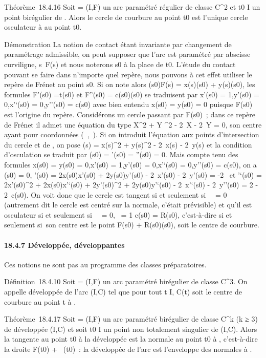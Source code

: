 Théorème~18.4.16 Soit \Gamma = (I,F) un arc paramétré régulier de classe
C^2 et t0 \in I un point birégulier de \Gamma. Alors le
cercle de courbure au point t0 est l'unique cercle osculateur
à \Gamma au point t0.

Démonstration La notion de contact étant invariante par changement de
paramétrage admissible, on peut supposer que l'arc est paramétré par
abscisse curviligne, s\mapsto~F(s) et nous noterons
s0 à la place de t0. L'étude du contact pouvant se
faire dans n'importe quel repère, nous pouvons à cet effet utiliser le
repère de Frénet au point s0. Si on note alors
\overrightarrowF(s0)F(s) =
x(s)\vect(s0) +
y(s)\vecn(s0), les formules
F'(s0) =\vec t(s0) et
F''(s0) =
c(s0)\vecn(s0) se traduisent par
x'(s0) = 1,y'(s0) = 0,x'`(s0) =
0,y''(s0) = c(s0) avec bien entendu x(s0)
= y(s0) = 0 puisque F(s0) est l'origine du repère.
Considérons un cercle passant par F(s0)~; dans ce repère de
Frénet il admet une équation du type X^2 + Y ^2 -
2\alpha~X - 2\beta~Y = 0, son centre ayant pour coordonnées (\alpha~,\beta~). Si on introduit
l'équation aux points d'intersection du cercle et de \Gamma, on pose \phi(s) =
x(s)^2 + y(s)^2 - 2\alpha~x(s) - 2\beta~y(s) et la condition
d'osculation se traduit par \phi(s0) = \phi'(s0) =
\phi''(s0) = 0. Mais compte tenu des formules x(s0) =
y(s0) = 0,x'(s0) = 1,y'(s0) =
0,x'`(s0) = 0,y''(s0) = c(s0), on a
\phi(s0) = 0, \phi'(s0) = 2x(s0)x'(s0)
+ 2y(s0)y'(s0) - 2\alpha~x'(s0) -
2\beta~y'(s0) = -2\alpha~ et \phi'`(s0) =
2x'(s0)^2 + 2x(s0)x'`(s0) +
2y'(s0)^2 + 2y(s0)y'`(s0) -
2\alpha~x'`(s0) - 2\beta~y''(s0) = 2 - 2\beta~c(s0). On
voit donc que le cercle est tangent si et seulement si~\alpha~ = 0 (autrement
dit le cercle est centré sur la normale, c'était prévisible) et qu'il
est osculateur si et seulement si~\alpha~ = 0,\beta~ = 1 \over
c(s0) = R(s0), c'est-à-dire si et seulement si~son
centre est le point F(s0) +
R(s0)\vecn(s0), soit le centre de
courbure.

\paragraph{18.4.7 Développée, développantes}

Ces notions ne sont pas au programme des classes préparatoires.

Définition~18.4.10 Soit \Gamma = (I,F) un arc paramétré birégulier de classe
C^3. On appelle développée de \Gamma l'arc (I,C) tel que pour tout
t \in I, C(t) soit le centre de courbure au point t à \Gamma.

Théorème~18.4.17 Soit \Gamma = (I,F) un arc paramétré birégulier de classe
C^k (k ≥ 3) de développée (I,C) et soit t0 \in I un
point non totalement singulier de (I,C). Alors la tangente au point
t0 à la développée est la normale au point t0 à \Gamma,
c'est-à-dire la droite F(t0) +
~\vecn\Gamma(t0)~: la développée de
l'arc \Gamma est l'enveloppe des normales à \Gamma.

